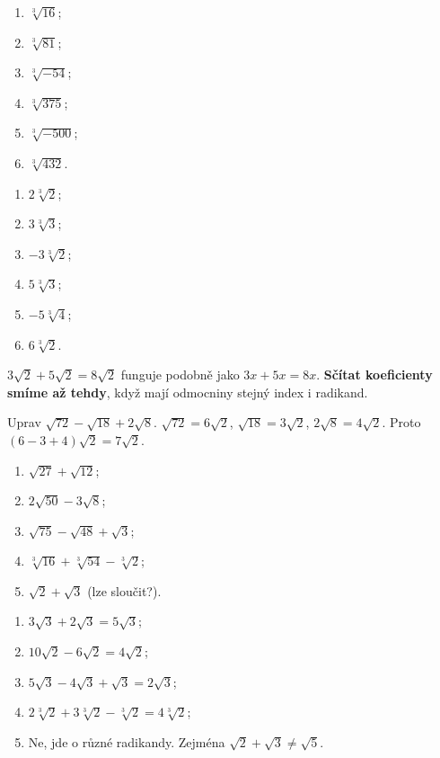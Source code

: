 \documentclass[11pt,a4paper]{article}
\begin{document}
\begin{zadaniReseniBox}[breakable=false,title={Samostatná práce 2: třetí odmocniny}]
\begin{enumerate}[label=\alph*)]
\item $\sqrt[3]{16}$; \item $\sqrt[3]{81}$;
\item $\sqrt[3]{-54}$; \item $\sqrt[3]{375}$;
\item $\sqrt[3]{-500}$; \item $\sqrt[3]{432}$.
\end{enumerate}
\tcblower
\begin{enumerate}[label=\alph*)]
\item $2\sqrt[3]2$; \item $3\sqrt[3]3$;
\item $-3\sqrt[3]2$; \item $5\sqrt[3]3$;
\item $-5\sqrt[3]4$; \item $6\sqrt[3]2$.
\end{enumerate}
\end{zadaniReseniBox}

$3\sqrt2+5\sqrt2=8\sqrt2$ funguje podobně jako $3x+5x=8x$.
\textbf{Sčítat koeficienty smíme až tehdy}, když mají odmocniny stejný index i radikand.
\begin{prikladReseniBox}[breakable=false,title={Příklad 3: nejprve odmocni částečně, pak slučuj}]
Uprav $\sqrt{72}-\sqrt{18}+2\sqrt8$.
\tcblower
$\sqrt{72}=6\sqrt2$, $\sqrt{18}=3\sqrt2$, $2\sqrt8=4\sqrt2$.
Proto $(6-3+4)\sqrt2=\boxed{7\sqrt2}$.
\end{prikladReseniBox}
\begin{zadaniReseniBox}[breakable=false,title={Samostatná práce 3: slučuj pouze stejné odmocniny}]
\begin{enumerate}[label=\alph*)]
\item $\sqrt{27}+\sqrt{12}$;
\item $2\sqrt{50}-3\sqrt8$;
\item $\sqrt{75}-\sqrt{48}+\sqrt3$;
\item $\sqrt[3]{16}+\sqrt[3]{54}-\sqrt[3]2$;
\item $\sqrt2+\sqrt3$ (lze sloučit?).
\end{enumerate}
\tcblower
\begin{enumerate}[label=\alph*)]
\item $3\sqrt3+2\sqrt3=5\sqrt3$;
\item $10\sqrt2-6\sqrt2=4\sqrt2$;
\item $5\sqrt3-4\sqrt3+\sqrt3=2\sqrt3$;
\item $2\sqrt[3]2+3\sqrt[3]2-\sqrt[3]2=4\sqrt[3]2$;
\item Ne, jde o různé radikandy. Zejména $\sqrt2+\sqrt3\ne\sqrt5$.
\end{enumerate}
\end{zadaniReseniBox}
\end{document}
